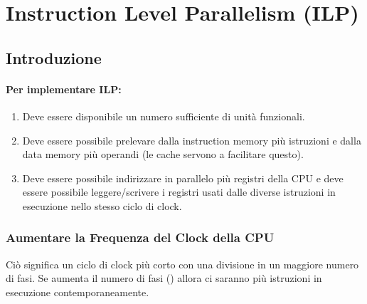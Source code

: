 \chapter{Instruction Level Parallelism (ILP)}

\section{Introduzione}


\subsubsection{Per implementare ILP:} 

\begin{enumerate}
  \item Deve essere disponibile un numero sufficiente di unità funzionali. 
  \item Deve essere possibile prelevare dalla instruction memory più istruzioni e 
    dalla data memory più operandi (le cache servono a facilitare questo). 
  \item Deve essere possibile indirizzare in parallelo più registri 
    della CPU e deve essere possibile leggere/scrivere i registri usati  dalle diverse istruzioni   in esecuzione nello stesso ciclo di clock.
\end{enumerate}

\subsection{Aumentare la Frequenza del Clock della CPU} 

Ciò significa un ciclo di clock più corto con una divisione in un maggiore numero di fasi. Se aumenta il numero di fasi () allora ci saranno più istruzioni in esecuzione contemporaneamente. 


